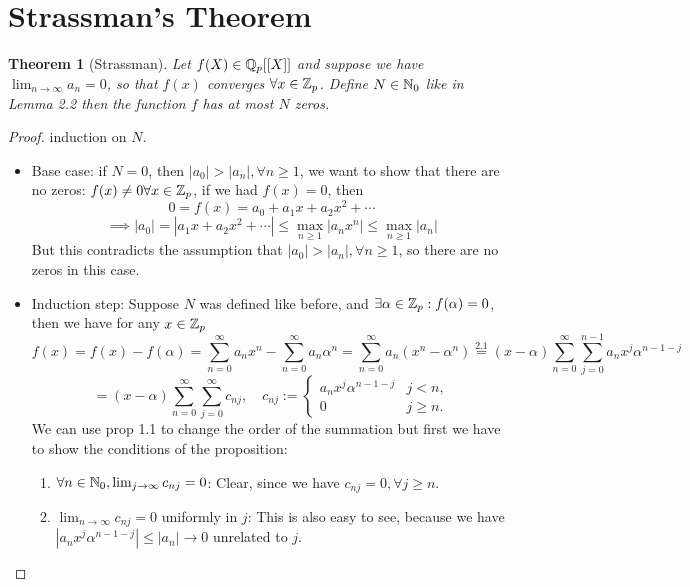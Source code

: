 \documentclass[a4paper]{article}
\theoremstyle{plain}
\newtheorem{thm}{Theorem}[section]
\theoremstyle{definition}
\begin{document}
\section{Strassman's Theorem}
\begin{thm}[Strassman]
Let $f(X) \in \Bbb Q_{p}[[X]]$ and suppose we have $\lim_{n \to \infty}a_{n} = 0$, so that $f(x)$ converges $\forall x \in \Bbb Z_{p}$. Define $N \in \Bbb N_{0}$ like in Lemma 2.2
then the function $f$ has at most $N$ zeros.
\end{thm}
\begin{proof}
  induction on $N$.
  \begin{itemize}
    \item Base case: if $N = 0$, then $|a_{0}| > |a_{n}|, \forall n \geq 1$, we want to show that there are no zeros: $f(x) \neq 0 \forall x \in \Bbb Z_{p}$, if we had $f(x) = 0$, then
          $$0 = f(x) = a_{0} + a_{1}x + a_{2}x^{2} + \cdots$$
          $$ \implies |a_{0}| = |a_{1}x + a_{2}x^{2} + \cdots| \leq \max_{n \geq 1}|a_{n}x^{n}| \leq \max_{n \geq 1}|a_{n}|$$
          But this contradicts the assumption that $|a_{0}| > |a_{n}|, \forall n \geq 1$, so there are no zeros in this case.
    \item Induction step:
          Suppose $N$ was defined like before, and $\exists \alpha \in \Bbb Z_{p} : f(\alpha) = 0$, then we have for any $x \in \Bbb Z_{p}$
          $$f(x) = f(x) - f(\alpha) = \sum_{n=0}^{\infty}a_{n}x^{n} - \sum_{n=0}^{\infty}a_{n}\alpha^{n} = \sum_{n=0}^{\infty}a_{n}(x^{n} - \alpha^{n}) \overset{2.1}= (x-\alpha)\sum_{n=0}^{\infty}\sum_{j = 0}^{n-1} a_{n}x^{j}\alpha^{n-1-j}$$
          $$ = (x-\alpha) \sum_{n=0}^{\infty} \sum_{j=0}^{\infty} c_{nj}, \quad c_{nj}:= \begin{cases}a_{n}x^{j}\alpha^{n-1-j} & j < n, \\ 0 & j \geq n.\end{cases}$$
          We can use prop 1.1 to change the order of the summation but first we have to show the conditions of the proposition:
          \begin{enumerate}
            \item $\forall n \in \Bbb N_{0}, \lim_{j \to \infty} c_{nj} = 0$:
                  Clear, since we have $c_{nj} = 0, \forall j \geq n$.
            \item $\lim_{n \to \infty}c_{nj} = 0$ uniformly in $j$:
                  This is also easy to see, because we have $|a_{n}x^{j}\alpha^{n-1-j}| \leq |a_{n}| \to 0$ unrelated to $j$.
          \end{enumerate}

\end{itemize}
\end{proof}
\end{document}
